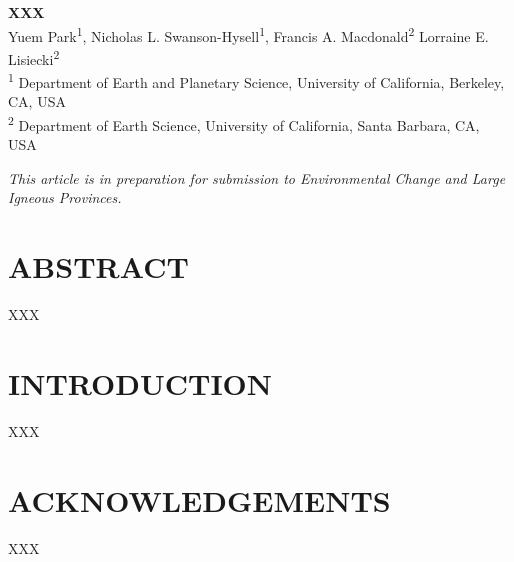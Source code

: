 \documentclass[11pt,letterpaper]{article}
\begin{document}
\begin{flushleft}
{\Large \textbf{XXX}}
\\
Yuem Park\textsuperscript{1},
Nicholas L. Swanson-Hysell\textsuperscript{1},
Francis A. Macdonald\textsuperscript{2}
Lorraine E. Lisiecki\textsuperscript{2}
\\
\bigskip
\textsuperscript{1} Department of Earth and Planetary Science, University of California, Berkeley, CA, USA
\\
\textsuperscript{2} Department of Earth Science, University of California, Santa Barbara, CA, USA
\bigskip

\end{flushleft}

\noindent\textit{This article is in preparation for submission to \textit{Environmental Change and Large Igneous Provinces}.}

\linenumbers

\section*{ABSTRACT \label{sec:ABSTRACT}}

XXX

\section*{INTRODUCTION \label{sec:INTRODUCTION}}

XXX

\section*{ACKNOWLEDGEMENTS \label{sec:ACKNOWLEDGEMENTS}}
\footnotesize

XXX

\singlespacing



\end{document}
